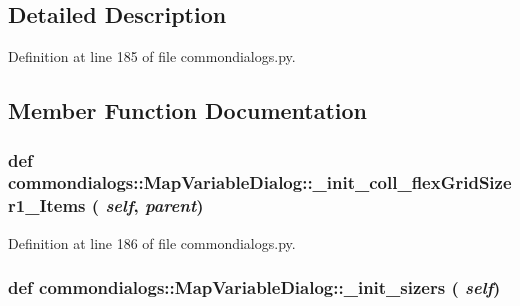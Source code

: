 \subsection{Detailed Description}




Definition at line 185 of file commondialogs.py.

\subsection{Member Function Documentation}
\hypertarget{classcommondialogs_1_1MapVariableDialog_912b9c33a957a879918c2dacfe12652b}{
\subsubsection[\_\-init\_\-coll\_\-flexGridSizer1\_\-Items]{\setlength{\rightskip}{0pt plus 5cm}def commondialogs::Map\-Variable\-Dialog::\_\-init\_\-coll\_\-flex\-Grid\-Sizer1\_\-Items ( {\em self},  {\em parent})}}
\label{classcommondialogs_1_1MapVariableDialog_912b9c33a957a879918c2dacfe12652b}




Definition at line 186 of file commondialogs.py.\hypertarget{classcommondialogs_1_1MapVariableDialog_c4327f2bda8902fd3267551603128090}{
\subsubsection[\_\-init\_\-sizers]{\setlength{\rightskip}{0pt plus 5cm}def commondialogs::Map\-Variable\-Dialog::\_\-init\_\-sizers ( {\em self})}}
\label{classcommondialogs_1_1MapVariableDialog_c4327f2bda8902fd3267551603128090}




